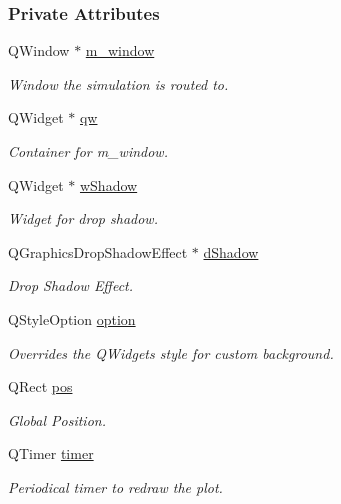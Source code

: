 \subsubsection*{Private Attributes}
\begin{DoxyCompactItemize}
\item 
Q\+Window $\ast$ \mbox{\hyperlink{classSmoke_a75cc318af83d2cf39a6609b8becafe38}{m\+\_\+window}}
\begin{DoxyCompactList}\small\item\em Window the simulation is routed to. \end{DoxyCompactList}\item 
Q\+Widget $\ast$ \mbox{\hyperlink{classSmoke_ae04389450b60548adaf2ff0e76399673}{qw}}
\begin{DoxyCompactList}\small\item\em Container for m\+\_\+window. \end{DoxyCompactList}\item 
Q\+Widget $\ast$ \mbox{\hyperlink{classSmoke_aa6b959618b43da0106cc49148be321e8}{w\+Shadow}}
\begin{DoxyCompactList}\small\item\em Widget for drop shadow. \end{DoxyCompactList}\item 
Q\+Graphics\+Drop\+Shadow\+Effect $\ast$ \mbox{\hyperlink{classSmoke_a26f011df30f860db285ef97713ca7989}{d\+Shadow}}
\begin{DoxyCompactList}\small\item\em Drop Shadow Effect. \end{DoxyCompactList}\item 
Q\+Style\+Option \mbox{\hyperlink{classSmoke_adaf76ba29af2bc7105de57280a7e0993}{option}}
\begin{DoxyCompactList}\small\item\em Overrides the Q\+Widget\textquotesingle{}s style for custom background. \end{DoxyCompactList}\item 
Q\+Rect \mbox{\hyperlink{classSmoke_ae762c3ace8ef3b2aafab01e1c28f7523}{pos}}
\begin{DoxyCompactList}\small\item\em Global Position. \end{DoxyCompactList}\item 
Q\+Timer \mbox{\hyperlink{classSmoke_ab86a0c9a3d30df9136fd8b2cb0c875ad}{timer}}
\begin{DoxyCompactList}\small\item\em Periodical timer to redraw the plot. \end{DoxyCompactList}\item 

\end{DoxyCompactItemize}
